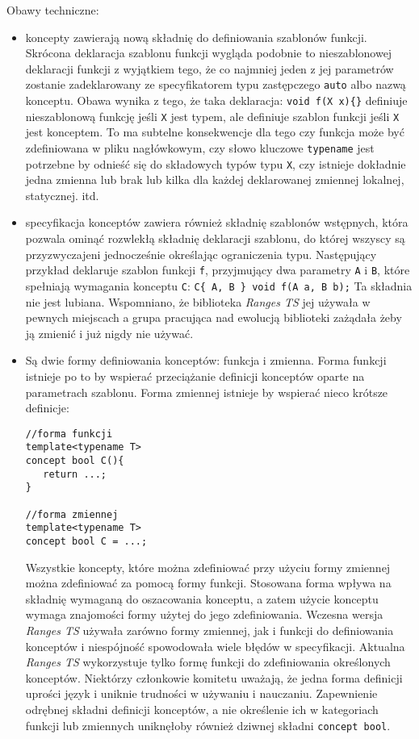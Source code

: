 \documentclass[11pt, a4paper]{article}
\begin{document}
Obawy techniczne:
\begin{itemize}

\item koncepty zawierają nową składnię do definiowania szablonów funkcji. Skrócona deklaracja szablonu funkcji wygląda podobnie to nieszablonowej deklaracji funkcji z wyjątkiem tego, że co najmniej jeden z jej  parametrów zostanie zadeklarowany ze specyfikatorem typu zastępczego \verb#auto# albo nazwą konceptu. Obawa wynika z tego, że taka deklaracja:\newline
\noindent \verb#void f(X x){}# \newline
definiuje nieszablonową funkcję jeśli \verb#X# jest typem, ale definiuje szablon funkcji jeśli \verb#X# jest konceptem. To ma subtelne konsekwencje dla tego czy funkcja może być zdefiniowana w pliku nagłówkowym, czy słowo kluczowe \verb#typename# jest potrzebne by odnieść się do składowych typów typu \verb#X#, czy istnieje dokładnie jedna zmienna lub brak lub kilka dla każdej deklarowanej zmiennej lokalnej, statycznej. itd.


\item specyfikacja konceptów zawiera również składnię szablonów wstępnych, która pozwala ominąć rozwlekłą składnię deklaracji szablonu, do której wszyscy są przyzwyczajeni jednocześnie określając ograniczenia typu. Następujący przykład deklaruje szablon funkcji \verb#f#, przyjmujący dwa parametry \verb#A# i \verb#B#, które spełniają wymagania konceptu \verb#C#: \newline
\verb#C{ A, B } void f(A a, B b);#\newline
Ta składnia nie jest lubiana. Wspomniano, że biblioteka \emph{Ranges TS} jej używała w pewnych miejscach a grupa pracująca nad ewolucją biblioteki zażądała żeby ją zmienić i już nigdy nie używać.
\item Są dwie formy definiowania konceptów: funkcja i zmienna. Forma funkcji istnieje po to by wspierać przeciążanie definicji konceptów oparte na parametrach szablonu. Forma zmiennej istnieje by wspierać nieco krótsze definicje:

\begin{lstlisting}[frame=single]
//forma funkcji
template<typename T>
concept bool C(){
   return ...;
}

//forma zmiennej
template<typename T>
concept bool C = ...;
\end{lstlisting}

Wszystkie koncepty, które można zdefiniować przy użyciu formy zmiennej można zdefiniować za pomocą formy funkcji. Stosowana forma wpływa na składnię wymaganą do oszacowania konceptu, a zatem użycie konceptu wymaga znajomości formy użytej do jego zdefiniowania. Wczesna wersja \emph{Ranges TS} używała zarówno formy zmiennej, jak i funkcji do definiowania konceptów i niespójność spowodowała wiele błędów w specyfikacji. Aktualna \emph{Ranges TS} wykorzystuje tylko formę funkcji do zdefiniowania określonych konceptów. Niektórzy członkowie komitetu uważają, że jedna forma definicji uprości język i uniknie trudności w używaniu i nauczaniu. Zapewnienie odrębnej składni definicji konceptów, a nie określenie ich w kategoriach funkcji lub zmiennych uniknęłoby również dziwnej składni \verb#concept bool#.


\end{itemize}
\end{document}
